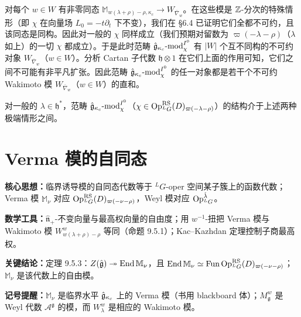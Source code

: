 对每个 $w\in W$ 有非零同态 $\mathbb{M}_{w(\lambda+\rho)-\rho,\kappa_c}\to W_{\overline{\nabla}_w}$。在这些模是 $\mathbb{Z}$-分次的特殊情形（即 $\chi$ 在向量场 $L_0=-t\partial_t$ 下不变），我们在 §6.4 已证明它们全都不可约，且该同态是同构。因此对一般的 $\chi$ 同样成立（我们预期对留数为 $\varpi(-\lambda-\rho)$（$\lambda$ 如上）的一切 $\chi$ 都成立）。于是此时范畴 $\hat{\mathfrak{g}}_{\kappa_c}\text{-mod}^{I^0}_\chi$ 有 $|W|$ 个互不同构的不可约对象 $W_{\overline{\nabla}_w}$（$w\in W$）。分析 Cartan 子代数 $\mathfrak{h}\otimes1$ 在它们上面的作用可知，它们之间不可能有非平凡扩张。因此范畴 $\hat{\mathfrak{g}}_{\kappa_c}\text{-mod}^{I^0}_\chi$ 的任一对象都是若干个不可约 Wakimoto 模 $W_{\overline{\nabla}_w}$（$w\in W$）的直和。

对一般的 $\lambda\in\mathfrak{h}^*$，范畴 $\hat{\mathfrak{g}}_{\kappa_c}\text{-mod}^{I^0}_\chi$（$\chi\in\operatorname{Op}^{\mathrm{RS}}_{{}^LG}(D)_{\varpi(-\lambda-\rho)}$）的结构介于上述两种极端情形之间。


\section{Verma 模的自同态}

\begin{keypoints}
    \item \textbf{核心思想：}临界诱导模的自同态代数等于 ${}^LG$-oper 空间某子簇上的函数代数；Verma 模 $\mathbb{M}_\nu$ 对应 $\operatorname{Op}^{\mathrm{RS}}_{{}^LG}(D)_{\varpi(-\nu-\rho)}$，Weyl 模对应 $\operatorname{Op}^{\check\lambda}_{{}^LG}$。
    \item \textbf{数学工具：}$\hat{\mathfrak{n}}_+$-不变向量与最高权向量的自由度；用 $w^{-1}$-扭把 Verma 模与 Wakimoto 模 $W^w_{w(\lambda+\rho)-\rho}$ 等同（命题 9.5.1）；Kac–Kazhdan 定理控制子商最高权。
    \item \textbf{关键结论：}定理 9.5.3：$Z(\hat{\mathfrak{g}})\twoheadrightarrow\operatorname{End}\mathbb{M}_\nu$，且 $\operatorname{End}\mathbb{M}_\nu\simeq\operatorname{Fun}\operatorname{Op}^{\mathrm{RS}}_{{}^LG}(D)_{\varpi(-\nu-\rho)}$；$\mathbb{M}_\nu$ 是该代数上的自由模。
    \item \textbf{记号提醒：}$\mathbb{M}_\nu$ 是临界水平 $\hat{\mathfrak{g}}_{\kappa_c}$ 上的 Verma 模（书用 blackboard 体）；$M^w_{\mathfrak{g}}$ 是 Weyl 代数 $\mathcal{A}^{\mathfrak{g}}$ 的模，而 $W^w_\lambda$ 是相应的 Wakimoto 模。
\end{keypoints}

